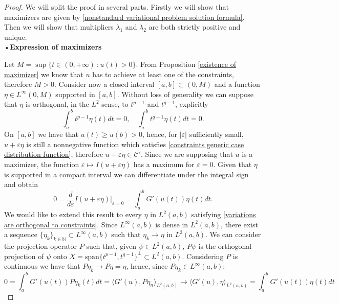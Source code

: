 \documentclass[corpo=11pt, stile=classica, tipotesi=custom,
greek, evenboxes, english]{toptesi}
\numberwithin{equation}{chapter}
\theoremstyle{definition}
\theoremstyle{remark}
\newcommand{\N}{\mathbb{N}} %
\begin{document}
\begin{proof}
We will split the proof in several parts. Firstly we will show that maximizers are given by \eqref{nonstandard variational problem solution formula}. Then we will show that multipliers $\lambda_1$ and $\lambda_2$ are both strictly positive and unique.\\
•\textbf{Expression of maximizers}

Let $M = \sup\{t \in (0,+\infty)\ : u(t) > 0\}$. From Proposition \ref{existence of maximizer} we know that $u$ has to achieve at least one of the constraints, therefore $M>0$. Consider now a closed interval $[a,b] \subset (0,M)$ and a function $\eta \in L^{\infty}(0,M)$ supported in $[a,b]$. Without loss of generality we can suppose that $\eta$ is orthogonal, in the $L^2$ sense, to $t^{p-1}$ and $t^{q-1}$, explicitly
\begin{equation}\label{variations are orthogonal to constraints}
	\int_a^b t^{p-1} \eta(t) dt=0, \quad \int_a^b t^{q-1} \eta(t) dt=0.
\end{equation}
On $[a,b]$ we have that $u(t) \geq u(b) > 0$, hence, for $|\varepsilon|$ sufficiently small, $u+\varepsilon\eta$ is still a nonnegative function which satisfies \eqref{constraints generic case distribution function}, therefore $u+\varepsilon\eta \in \mathcal{C}'$. Since we are supposing that $u$ is a maximizer, the function $\varepsilon \mapsto I(u+\varepsilon\eta)$ has a maximum for $\varepsilon = 0$. Given that $\eta$ is supported in a compact interval we can differentiate under the integral sign and obtain
\begin{equation*}
	0 = \dfrac{d}{d\varepsilon}I(u+\varepsilon\eta) \lvert_{\varepsilon=0} = \int_a^b G'(u(t))\eta(t)dt.
\end{equation*}
We would like to extend this result to every $\eta$ in $L^2(a,b)$ satisfying \eqref{variations are orthogonal to constraints}. Since $L^{\infty}(a,b)$ is dense in $L^2(a,b)$, there exist a sequence $\{\eta_k\}_{k \in \N} \subset L^{\infty}(a,b)$ such that $\eta_k \rightarrow \eta$ in $L^2(a,b)$. We can consider the projection operator $P$ such that, given $\psi \in L^2(a,b)$, $P\psi$ is the orthogonal projection of $\psi$ onto $ X = \mathrm{span}\{t^{p-1},t^{q-1}\}^{\perp} \subset L^2(a,b)$. Considering $P$ is continuous we have that $P\eta_k \rightarrow P\eta = \eta$, hence, since $P\eta_k \in L^{\infty}(a,b)$:
\begin{equation*}
	0 = \int_a^b G'(u(t)) P\eta_k(t) dt = \langle G'(u), P\eta_n \rangle_{L^2(a,b)} \rightarrow \langle G'(u), \eta \rangle_{L^2(a,b)} = \int_a^b G'(u(t)) \eta(t) dt

\end{equation*}
\end{proof}
\end{document}
